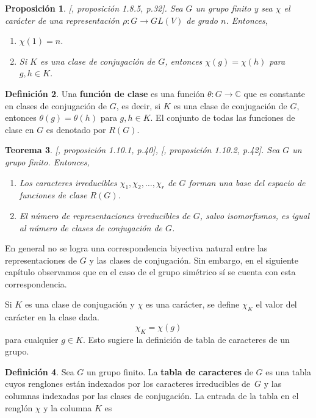 \documentclass[12pt]{book}
\newtheorem{theorem}{Teorema}[section]
\newtheorem{proposition}[theorem]{Proposición}
\theoremstyle{definition}
\newtheorem{definition}[theorem]{Definición}
\newcounter{in}
\newcounter{ini}
\begin{document}
\begin{proposition}{[\cite{sagan2001symmetric}, proposición 1.8.5, p.32]}.
  Sea $G$ un grupo finito y sea $\chi$ el carácter de una
  representación $\rho:G\rightarrow GL(V)$ de grado $n$. Entonces,
  \begin{enumerate}
  \item $\chi(1)=n$.
  \item Si $K$ es una clase de conjugación de $G$, entonces $\chi(g)=\chi(h)$ para $g,h\in K$. 
  \end{enumerate}
\end{proposition}
\begin{definition}
  Una \textbf{función de clase} es una función
  $\theta:G\rightarrow\mathbb{C}$ que es constante en clases de
  conjugación de $G$, es decir, si $K$ es una clase de conjugación de
  $G$, entonces $\theta(g)=\theta(h)$ para $g,h\in K$. El conjunto de
  todas las funciones de clase en $G$ es denotado por $R(G)$.
\end{definition} 
\begin{theorem}{[\cite{sagan2001symmetric}, proposición 1.10.1, p.40]}, {[\cite{sagan2001symmetric}, proposición 1.10.2, p.42]}.
  \label{no-rep-irr-no-cla-conj}
  Sea $G$ un grupo finito. Entonces,
  \begin{enumerate}
  \item Los caracteres irreducibles
    $\chi_{1},\chi_{2},\ldots,\chi_{r}$ de $G$ forman una base del
    espacio de funciones de clase $R(G)$.
    \item El número de representaciones irreducibles de $G$, salvo
      isomorfismos, es igual al número de clases de conjugación de $G$.
  \end{enumerate}
\end{theorem}
En general no se logra una correspondencia biyectiva natural entre las
representaciones de $G$ y las clases de conjugación. Sin embargo, en
el siguiente capítulo observamos que en el caso de el grupo simétrico sí se cuenta con
esta correspondencia.

Si $K$ es una clase de conjugación y $\chi$ es una carácter, se define
$\chi_{K}$ el valor del carácter en la clase dada.
\begin{equation*}
  \chi_{K}=\chi(g)
\end{equation*}
para cualquier $g\in K$. Esto sugiere la definición de tabla de caracteres de
un grupo. 
\begin{definition}
  Sea $G$ un grupo finito. La \textbf{tabla de caracteres} de $G$ es
  una tabla cuyos renglones están indexados por los caracteres
  irreducibles de~$G$ y las columnas indexadas por las clases de
  conjugación. La entrada de la tabla en el renglón $\chi$ y la columna $K$ es
\end{definition}
\end{document}
